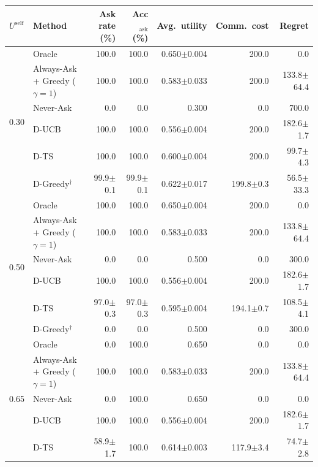 \begin{tabular}{llrrrrr}
\toprule
$U^{\mathrm{self}}$ & Method & Ask rate (\%) & Acc$_{\mathrm{ask}}$ (\%) & Avg.\ utility & Comm.\ cost & Regret \\
\midrule
\multirow{6}{*}{0.30} & Oracle & 100.0 & 100.0 & 0.650{\scriptsize$\pm$0.004} & 200.0 & 0.0 \\
 & Always-Ask + Greedy ($\gamma{=}1$) & 100.0 & 100.0 & 0.583{\scriptsize$\pm$0.033} & 200.0 & 133.8{\scriptsize$\pm$64.4} \\
 & Never-Ask & 0.0 & 0.0 & 0.300 & 0.0 & 700.0 \\
 & D-UCB & 100.0 & 100.0 & 0.556{\scriptsize$\pm$0.004} & 200.0 & 182.6{\scriptsize$\pm$1.7} \\
 & D-TS & 100.0 & 100.0 & 0.600{\scriptsize$\pm$0.004} & 200.0 & 99.7{\scriptsize$\pm$4.3} \\
 & D-Greedy$^\dagger$ & 99.9{\scriptsize$\pm$0.1} & 99.9{\scriptsize$\pm$0.1} & 0.622{\scriptsize$\pm$0.017} & 199.8{\scriptsize$\pm$0.3} & 56.5{\scriptsize$\pm$33.3} \\
\midrule
\multirow{6}{*}{0.50} & Oracle & 100.0 & 100.0 & 0.650{\scriptsize$\pm$0.004} & 200.0 & 0.0 \\
 & Always-Ask + Greedy ($\gamma{=}1$) & 100.0 & 100.0 & 0.583{\scriptsize$\pm$0.033} & 200.0 & 133.8{\scriptsize$\pm$64.4} \\
 & Never-Ask & 0.0 & 0.0 & 0.500 & 0.0 & 300.0 \\
 & D-UCB & 100.0 & 100.0 & 0.556{\scriptsize$\pm$0.004} & 200.0 & 182.6{\scriptsize$\pm$1.7} \\
 & D-TS & 97.0{\scriptsize$\pm$0.3} & 97.0{\scriptsize$\pm$0.3} & 0.595{\scriptsize$\pm$0.004} & 194.1{\scriptsize$\pm$0.7} & 108.5{\scriptsize$\pm$4.1} \\
 & D-Greedy$^\dagger$ & 0.0 & 0.0 & 0.500 & 0.0 & 300.0 \\
\midrule
\multirow{6}{*}{0.65} & Oracle & 0.0 & 100.0 & 0.650 & 0.0 & 0.0 \\
 & Always-Ask + Greedy ($\gamma{=}1$) & 100.0 & 100.0 & 0.583{\scriptsize$\pm$0.033} & 200.0 & 133.8{\scriptsize$\pm$64.4} \\
 & Never-Ask & 0.0 & 100.0 & 0.650 & 0.0 & 0.0 \\
 & D-UCB & 100.0 & 100.0 & 0.556{\scriptsize$\pm$0.004} & 200.0 & 182.6{\scriptsize$\pm$1.7} \\
 & D-TS & 58.9{\scriptsize$\pm$1.7} & 100.0 & 0.614{\scriptsize$\pm$0.003} & 117.9{\scriptsize$\pm$3.4} & 74.7{\scriptsize$\pm$2.8} \\

\end{tabular}

